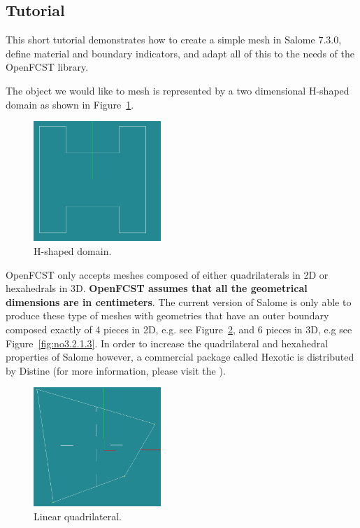 \subsection{Tutorial}
This short tutorial demonstrates how to create a simple mesh in Salome 7.3.0, define material and boundary indicators, and adapt all of this to the needs of the OpenFCST library.

The object we would like to mesh is represented by a two dimensional H-shaped domain as shown in Figure~\ref{fig:no3.2.1.1}.

\begin{figure}[tbp]
\begin{center}
\includegraphics[width=0.43\textwidth]{figures/salome0.png}
\caption{H-shaped domain.}
\label{fig:no3.2.1.1}
\end{center}
\end{figure}

OpenFCST only accepts meshes composed of either quadrilaterals in 2D or hexahedrals in 3D. \textbf{OpenFCST assumes that all the geometrical dimensions are in centimeters}. The current version of Salome is only able to produce these type of meshes with geometries that have an outer boundary composed exactly of 4 pieces in 2D, e.g. see Figure~\ref{fig:no3.2.1.2}, and 6 pieces in 3D, e.g see Figure~\ref{fig:no3.2.1.3}. In order to increase the quadrilateral and hexahedral properties of Salome however, a commercial package called Hexotic is distributed by Distine (for more information, please visit the ).

\begin{figure}[tbp]
\begin{center}
\includegraphics[width=0.43\textwidth]{figures/salome01.png}
\caption{Linear quadrilateral.}
\label{fig:no3.2.1.2}
\end{center}
\end{figure}

